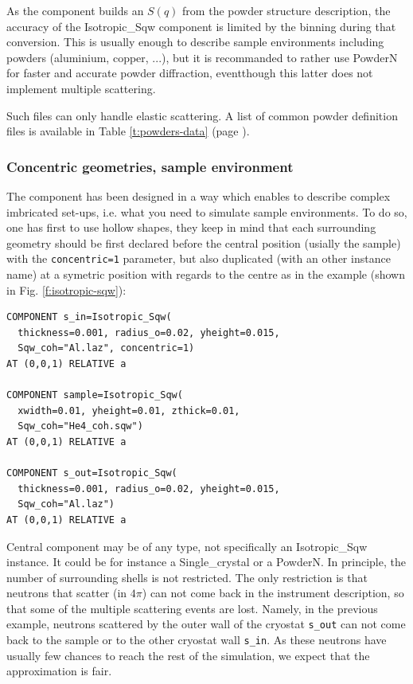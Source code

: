 As the component builds an $S(q)$ from the powder structure description, the accuracy of the Isotropic\_Sqw component is limited by the binning during that conversion. This is usually enough to describe sample environments including powders (aluminium, copper, ...), but it is recommanded to rather use PowderN for faster and accurate powder diffraction, eventthough this latter does not implement multiple scattering.

Such files can only handle elastic scattering. A list of common powder definition files is available in Table \ref{t:powders-data} (page \pageref{t:powders-data}).

\subsubsection{Concentric geometries, sample environment}

The component has been designed in a way which enables to describe complex imbricated set-ups, i.e. what you need to simulate sample environments. To do so, one has first to use hollow shapes, they keep in mind that each surrounding geometry should be first declared before the central position (usially the sample) with the \verb+concentric=1+ parameter, but also duplicated (with an other instance name) at a symetric position with regards to the centre as in the example (shown in Fig. \ref{f:isotropic-sqw}):
\begin{verbatim}
COMPONENT s_in=Isotropic_Sqw(
  thickness=0.001, radius_o=0.02, yheight=0.015,
  Sqw_coh="Al.laz", concentric=1)
AT (0,0,1) RELATIVE a

COMPONENT sample=Isotropic_Sqw(
  xwidth=0.01, yheight=0.01, zthick=0.01,
  Sqw_coh="He4_coh.sqw")
AT (0,0,1) RELATIVE a

COMPONENT s_out=Isotropic_Sqw(
  thickness=0.001, radius_o=0.02, yheight=0.015,
  Sqw_coh="Al.laz")
AT (0,0,1) RELATIVE a
\end{verbatim}
Central component may be of any type, not specifically an Isotropic\_Sqw instance. It could be for instance a Single\_crystal or a PowderN.
In principle, the number of surrounding shells is not restricted.
The only restriction is that neutrons that scatter (in $4\pi$) can not come back in the instrument description, so that some of the multiple scattering events are lost. Namely, in the previous example, neutrons scattered by the outer wall of the cryostat \verb+s_out+ can not come back to the sample or to the other cryostat wall \verb+s_in+. As these neutrons have usually few chances to reach the rest of the simulation, we expect that the approximation is fair.

